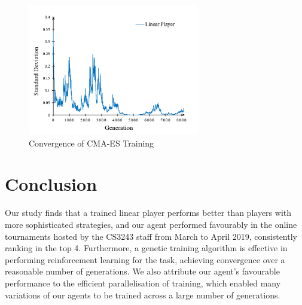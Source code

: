 \documentclass{article}
\begin{document}
\begin{figure}[h!]
\centering
\includegraphics[width=7.5cm]{report/TrainingResultsConvergenceCMA.png}
\caption{Convergence of CMA-ES Training}
\label{cma}
\end{figure}

\section{Conclusion}

Our study finds that a trained linear player performs better than players with more sophisticated strategies, and our agent performed favourably in the online tournaments hosted by the CS3243 staff from March to April 2019, consistently ranking in the top 4. Furthermore, a genetic training algorithm is effective in performing reinforcement learning for the task, achieving convergence over a reasonable number of generations. We also attribute our agent's favourable performance to the efficient parallelisation of training, which enabled many variations of our agents to be trained across a large number of generations.

\newpage
\end{document}
